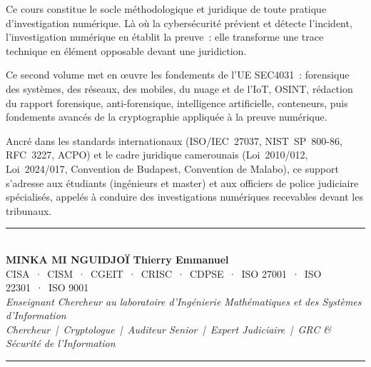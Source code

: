 \documentclass[12pt, twoside, openright, a4paper]{book}
\begin{document}
\begin{center}
\begin{minipage}{0.75\textwidth}
\color{white!85!gray}
Ce cours constitue le socle méthodologique et juridique de toute pratique
d'investigation numérique. Là où la cybersécurité prévient et détecte
l'incident, l'investigation numérique en établit la preuve~: elle
transforme une trace technique en élément opposable devant une
juridiction.

\medskip

Ce second volume met en œuvre les fondements de l'UE SEC4031~: forensique
des systèmes, des réseaux, des mobiles, du nuage et de l'IoT, OSINT,
rédaction du rapport forensique, anti-forensique, intelligence artificielle,
conteneurs, puis fondements avancés de la cryptographie appliquée à la
preuve numérique.

\medskip

Ancré dans les standards internationaux (ISO/IEC~27037, NIST~SP~800-86,
RFC~3227, ACPO) et le cadre juridique camerounais (Loi~2010/012,
Loi~2024/017, Convention de Budapest, Convention de Malabo), ce support
s'adresse aux étudiants (ingénieurs et master) et aux officiers de
police judiciaire  spécialisés, appelés à conduire des investigations numériques
recevables devant les tribunaux.
\end{minipage}
\end{center}

\vfill

\begin{center}
    {\color{CouleurAccent}\rule{0.7\linewidth}{1.2pt}}\\[1.2ex]
    {\color{white}\large\bfseries MINKA MI NGUIDJOÏ Thierry Emmanuel}\\[0.4ex]
    {\color{white!80!gray}\small
        CISA~·~CISM~·~CGEIT~·~CRISC~·~CDPSE~·~ISO 27001~·~ISO 22301~·~ISO 9001}\\[0.3ex]
    {\color{white!70!gray}\footnotesize\itshape
        Enseignant Chercheur au laboratoire d'Ingénierie Mathématiques et des Systèmes d'Information}\\[0.3ex]
    {\color{white!70!gray}\footnotesize\itshape
        Chercheur~|~Cryptologue~|~Auditeur Senior~|~Expert Judiciaire~|~GRC \& Sécurité de l'Information}\\[1.2ex]
    {\color{CouleurAccent}\rule{0.7\linewidth}{1.2pt}}
\end{center}

\afterpage{\nopagecolor}
\end{document}
